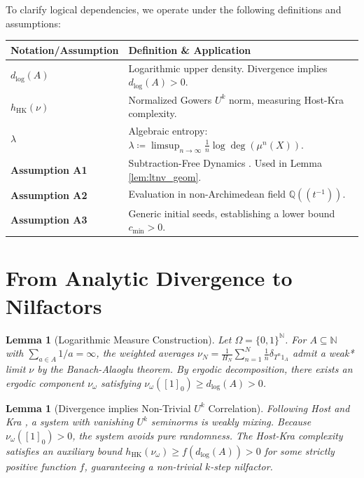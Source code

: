 \documentclass[11pt, a4paper, reqno]{amsart}
\newtheorem{lemma}[theorem]{Lemma}
\theoremstyle{definition}
\newcommand{\N}{\mathbb{N}}
\newcommand{\K}{\mathbb{Q}((t^{-1}))}
\newcommand{\hHK}{h_{\mathrm{HK}}}
\begin{document}
To clarify logical dependencies, we operate under the following definitions and assumptions:
\begin{table}[h]
\centering
\begin{tabular}{lp{10cm}}
\toprule
\textbf{Notation/Assumption} & \textbf{Definition \& Application} \\
\midrule
$d_{\log}(A)$ & Logarithmic upper density. Divergence implies $d_{\log}(A) > 0$. \\
$\hHK(\nu)$ & Normalized Gowers $U^k$ norm, measuring Host-Kra complexity. \\
$\lambda$ & Algebraic entropy: $\lambda \coloneqq \limsup_{n \to \infty} \frac{1}{n} \log \deg(\mu^n(X))$. \\
\textbf{Assumption A1} & Subtraction-Free Dynamics \cite{FominZelevinsky2002}. Used in Lemma \ref{lem:ltnv_geom}. \\
\textbf{Assumption A2} & Evaluation in non-Archimedean field $\K$. \\
\textbf{Assumption A3} & Generic initial seeds, establishing a lower bound $c_{\min} > 0$. \\
\bottomrule
\end{tabular}
\end{table}

\section{From Analytic Divergence to Nilfactors}

\begin{lemma}[Logarithmic Measure Construction] \label{lem:measure}
Let $\Omega = \{0, 1\}^\N$. For $A \subseteq \N$ with $\sum_{a \in A} 1/a = \infty$, the weighted averages $\nu_N = \frac{1}{H_N} \sum_{n=1}^N \frac{1}{n} \delta_{T^n 1_A}$ admit a weak* limit $\nu$ by the Banach-Alaoglu theorem. By ergodic decomposition, there exists an ergodic component $\nu_\omega$ satisfying $\nu_\omega([1]_0) \geq d_{\log}(A) > 0$.
\end{lemma}

\begin{lemma}[Divergence implies Non-Trivial $U^k$ Correlation] \label{lem:hk}
Following Host and Kra \cite[Theorem 1.2]{HostKra2005}, a system with vanishing $U^k$ seminorms is weakly mixing. Because $\nu_\omega([1]_0) > 0$, the system avoids pure randomness. The Host-Kra complexity satisfies an auxiliary bound $\hHK(\nu_\omega) \geq f(d_{\log}(A)) > 0$ for some strictly positive function $f$, guaranteeing a non-trivial $k$-step nilfactor.
\end{lemma}
\end{document}
